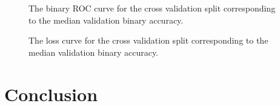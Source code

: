 \documentclass[twocolumn]{article}
\begin{document}
\begin{figure}
\begin{center}
\end{center}
\caption{The binary ROC curve for the cross validation split corresponding to
  the median validation binary accuracy.}
\label{fig:NeuralNetworkROC}
\end{figure}

\begin{figure}
\begin{center}
\end{center}
\caption{The loss curve for the cross validation split corresponding to the
  median validation binary accuracy.}
\label{fig:NeuralNetworkLoss}
\end{figure}

\section{Conclusion}
\label{sec:Conclusion}

\printbibliography
\end{document}
